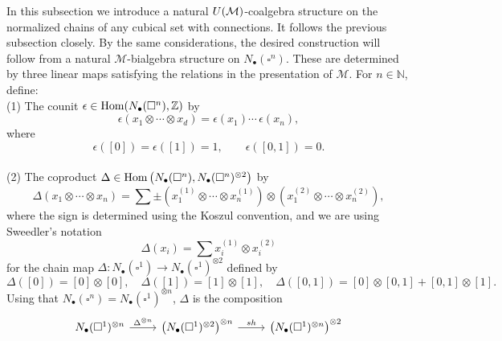 In this subsection we introduce a natural $U(\mathcal{M})$-coalgebra structure on the normalized chains of any cubical set with connections.
It follows the previous subsection closely.
By the same considerations, the desired construction will follow from a natural $\mathcal M$-bialgebra structure on $N_\bullet(\square^n)$.
These are determined by three linear maps satisfying the relations in the presentation of $\mathcal M$.
For $n \in \mathbb{N}$, define: \vspace*{5pt} \\
(1) The counit $\epsilon \in \mathrm{Hom}(N_\bullet(\square^n), \mathbb{Z})$ by
\begin{equation*}
\epsilon \left( x_1 \otimes \cdots \otimes x_d \right) = \epsilon(x_1) \cdots \, \epsilon(x_n),
\end{equation*}
where
\begin{equation*}
\epsilon([0]) = \epsilon([1]) = 1, \qquad \epsilon([0, 1]) = 0.
\end{equation*} \vspace*{-6pt} \\
(2) The coproduct $\Delta \in \mathrm{Hom} \left( N_\bullet(\square^n), N_\bullet(\square^n)^{\otimes 2} \right)$ by
\begin{equation*}	
\Delta (x_1 \otimes \cdots \otimes x_n) = 	
\sum \pm \left( x_1^{(1)} \otimes \cdots \otimes x_n^{(1)} \right) \otimes 	
\left( x_1^{(2)} \otimes \cdots \otimes x_n^{(2)} \right),	
\end{equation*}	
where the sign is determined using the Koszul convention, and we are using Sweedler's notation
\begin{equation*}	
\Delta(x_i) = \sum x_i^{(1)} \otimes x_i^{(2)}
\end{equation*}
for the chain map $\Delta \colon N_\bullet(\square^1) \to N_\bullet(\square^1)^{\otimes 2}$ defined by
\begin{equation*}
\Delta([0]) = [0] \otimes [0], \quad \Delta([1]) = [1] \otimes [1], \quad \Delta([0, 1]) = [0] \otimes [0, 1] + [0, 1] \otimes [1].
\end{equation*}
Using that $N_\bullet(\square^n) = N_\bullet(\square^1)^{\otimes n}$, $\Delta$ is the composition
\begin{equation*}
\begin{tikzcd}
N_\bullet(\square^1)^{\otimes n} \arrow[r, "\Delta^{\otimes n}"] & \left( N_\bullet(\square^1)^{\otimes 2}  \right)^{\otimes n} \arrow[r, "sh"] & \left( N_\bullet(\square^1)^{\otimes n} \right)^{\otimes 2}
\end{tikzcd}
\end{equation*}
